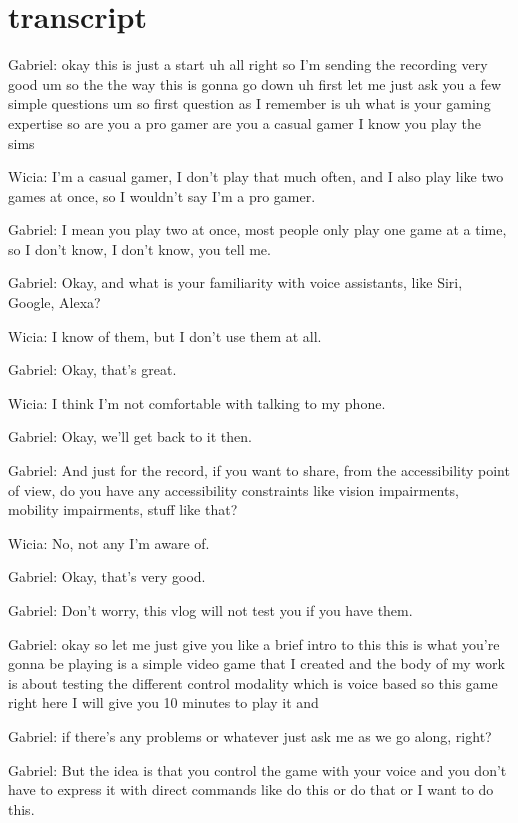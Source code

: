 
\section{transcript}

Gabriel: okay this is just a start uh all right so I'm sending the recording very good um so the the way this is gonna go down uh first let me just ask you a few simple questions um so first question as I remember is uh what is your gaming expertise so are you a pro gamer are you a casual gamer I know you play the sims

Wicia: I'm a casual gamer, I don't play that much often, and I also play like two games at once, so I wouldn't say I'm a pro gamer.

Gabriel: I mean you play two at once, most people only play one game at a time, so I don't know, I don't know, you tell me.

Gabriel: Okay, and what is your familiarity with voice assistants, like Siri, Google, Alexa?

Wicia: I know of them, but I don't use them at all.

Gabriel: Okay, that's great.

Wicia: I think I'm not comfortable with talking to my phone.

Gabriel: Okay, we'll get back to it then.

Gabriel: And just for the record, if you want to share, from the accessibility point of view, do you have any accessibility constraints like vision impairments, mobility impairments, stuff like that?

Wicia: No, not any I'm aware of.

Gabriel: Okay, that's very good.

Gabriel: Don't worry, this vlog will not test you if you have them.

Gabriel: okay so let me just give you like a brief intro to this this is what you're gonna be playing is a simple video game that I created and the body of my work is about testing the different control modality which is voice based so this game right here I will give you 10 minutes to play it and

Gabriel: if there's any problems or whatever just ask me as we go along, right?

Gabriel: But the idea is that you control the game with your voice and you don't have to express it with direct commands like do this or do that or I want to do this.

